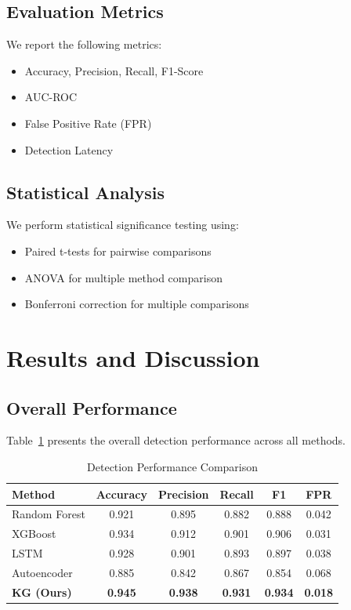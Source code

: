 \documentclass[preprint,12pt]{elsarticle}
\begin{document}
\subsection{Evaluation Metrics}

We report the following metrics:

\begin{itemize}
    \item Accuracy, Precision, Recall, F1-Score
    \item AUC-ROC
    \item False Positive Rate (FPR)
    \item Detection Latency
\end{itemize}

\subsection{Statistical Analysis}

We perform statistical significance testing using:

\begin{itemize}
    \item Paired t-tests for pairwise comparisons
    \item ANOVA for multiple method comparison
    \item Bonferroni correction for multiple comparisons
\end{itemize}


\section{Results and Discussion}
\label{sec:results}

\subsection{Overall Performance}

Table~\ref{tab:results} presents the overall detection performance across all methods.

\begin{table}[htbp]
\centering
\caption{Detection Performance Comparison}
\label{tab:results}
\begin{tabular}{lccccc}
\toprule
Method & Accuracy & Precision & Recall & F1 & FPR \\
\midrule
Random Forest & 0.921 & 0.895 & 0.882 & 0.888 & 0.042 \\
XGBoost & 0.934 & 0.912 & 0.901 & 0.906 & 0.031 \\
LSTM & 0.928 & 0.901 & 0.893 & 0.897 & 0.038 \\
Autoencoder & 0.885 & 0.842 & 0.867 & 0.854 & 0.068 \\
\textbf{KG (Ours)} & \textbf{0.945} & \textbf{0.938} & \textbf{0.931} & \textbf{0.934} & \textbf{0.018} \\
\bottomrule
\end{tabular}
\end{table}
\end{document}
